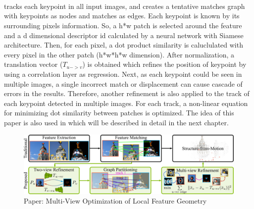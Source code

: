 \documentclass[11pt]{article}
\begin{document}
    \paragraph{~\cite{Dusmanu2020Multi}} tracks each keypoint in all input images, and creates a tentative
    matches graph with keypoints as nodes and matches as edges. Each keypoint is known by its surrounding pixels
    information. So, a h*w patch is selected around the feature and a d dimensional descriptor id calculated by
    a neural network with Siamese architecture. Then, for each pixel, a dot product similarity is caluclulated
    with every pixel in the other patch (h*w*h*w dimension). After normalization, a translation vector ($T_{u->v}$)
    is obtained which refines the position of keypoint by using a correlation layer as regression. Next, as each
    keypoint could be seen in multiple images,
    a single incorrect match or displacement can cause cascade of errors in the results. Therefore, another
    refinement is also applied to the track of each keypoint detected in multiple images. For each track,
    a non-linear equation for minimizing dot similarity between patches is optimized. The idea of this paper
    is also used in \cite{lindenberger2021pixsfm} which will be described in detail in the next chapter.

    \begin{figure}
    \caption{Paper: Multi-View Optimization of Local Feature Geometry}
    \centering
    \includegraphics[width=\textwidth,height=\textheight,keepaspectratio]{images/dusmano.jpg}
    \end{figure}
\end{document}
